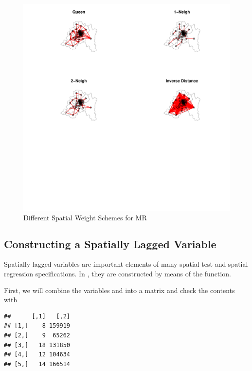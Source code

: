 \begin{figure}[h!]
  \caption{Different Spatial Weight Schemes for MR}
    \label{fig:more_ws}
\begin{knitrout}
\color{fgcolor}

{\centering \includegraphics[width=\maxwidth]{figure/plot-all-wsT-1} 

}


\end{knitrout}
\end{figure}

\subsection{Constructing a Spatially Lagged Variable}

Spatially lagged variables are important elements of many spatial test and spatial regression specifications. In , they are constructed by means of the  function.

First, we will combine the variables  and  into a matrix and check the contents with 

\begin{knitrout}
\color{fgcolor}\begin{kframe}
\begin{alltt}
 \hlkwb{<-} \hlopt{$}\hlopt{$}
 \hlstd{)}
\end{alltt}
\begin{verbatim}
##      [,1]   [,2]
## [1,]    8 159919
## [2,]    9  65262
## [3,]   18 131850
## [4,]   12 104634
## [5,]   14 166514
\end{verbatim}
\end{kframe}
\end{knitrout}

